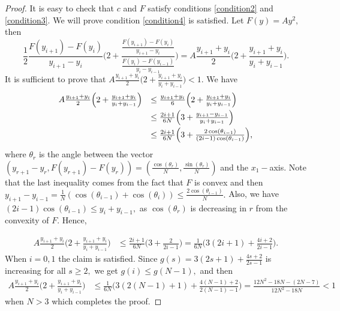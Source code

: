 \documentclass[12pt,reqno]{amsart}
\begin{document}
\begin{proof}
    It is easy to check that $c$ and $F$ satisfy conditions \ref{condition2} and \ref{condition3}. We will prove condition \ref{condition4} is satisfied. Let $F(y)=Ay^2,$ then 
    \[\frac{1}{2}\frac{F(y_{i+1})-F(y_i)}{y_{i+1}-y_i}\Big(2+\frac{\frac{F(y_{i+1})-F(y_i)}{y_{i+1}-y_i}}{\frac{F(y_{i})-F(y_{i-1})}{y_{i}-y_{i-1}}}\Big)=A\frac{y_{i+1}+y_i}{2}\Big(2+\frac{y_{i+1}+y_i}{y_{i}+y_{i-1}}\Big).\] It is sufficient to prove that $A\frac{y_{i+1}+y_i}{2}\Big(2+\frac{y_{i+1}+y_i}{y_{i}+y_{i-1}}\Big)<1.$ We have 
    \[\begin{array}{ll}
    A\frac{y_{i+1}+y_i}{2}\Big(2+\frac{y_{i+1}+y_i}{y_{i}+y_{i-1}}\Big)&\le\frac{y_{i+1}+y_i}{6}\Big(2+\frac{y_{i+1}+y_i}{y_{i}+y_{i-1}}\Big)\vspace{3pt}\\
    &\le\frac{2i+1}{6N}\Big(3+\frac{y_{i+1}-y_{i-1}}{y_{i}+y_{i-1}}\Big)\vspace{3pt}\\
    &\le\frac{2i+1}{6N}\Big(3+\frac{2\cos(\theta_{i-1})}{(2i-1)\cos(\theta_{i-1})}\Big),
    
    \end{array}\]
    where $\theta_r$ is the angle between the vector $(y_{r+1}-y_r,F(y_{r+1})-F(y_r))=(\frac{\cos(\theta_r)}{N},\frac{\sin(\theta_r)}{N})$ and the $x_1-$axis. Note that the last inequality comes from the fact that $F$ is convex and then $y_{i+1}-y_{i-1}=\frac{1}{N}(\cos(\theta_{i-1})+\cos(\theta_i))\le\frac{2\cos(\theta_{i-1})}{N}.$ Also, we have $(2i-1)\cos(\theta_{i-1})\le y_i+y_{i-1},$ as $\cos(\theta_r)$ is decreasing in $r$ from the convexity of $F.$ Hence,
    
    \[\begin{array}{ll}
    A\frac{y_{i+1}+y_i}{2}\Big(2+\frac{y_{i+1}+y_i}{y_{i}+y_{i-1}}\Big)&\le\frac{2i+1}{6N}\Big(3+\frac{2}{2i-1}\Big)=\frac{1}{6N}\Big(3(2i+1)+\frac{4i+2}{2i-1}\Big).
    
    \end{array}\]
    When $i=0,1$ the claim is satisfied.  Since $g(s)=3(2s+1)+\frac{4s+2}{2s-1}$ is increasing for all $s\ge2,$ we get $g(i)\le g(N-1),$ and then
    \[\begin{array}{ll}
    A\frac{y_{i+1}+y_i}{2}\Big(2+\frac{y_{i+1}+y_i}{y_{i}+y_{i-1}}\Big)&\le\frac{1}{6N}\Big(3(2(N-1)+1)+\frac{4(N-1)+2}{2(N-1)-1}\Big)=\frac{12N^2-18N-(2N-7)}{12N^2-18N}<1
    
    \end{array}\]
    when $N>3$ which completes the proof.
\end{proof}
\end{document}
